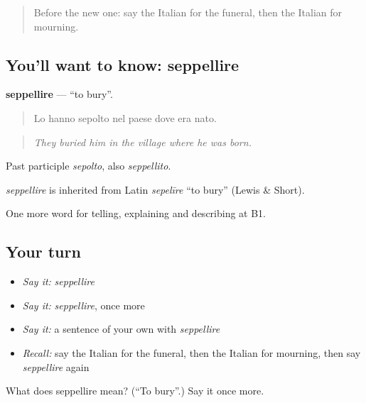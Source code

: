 \label{lesson:IT-C313-seppellire}



\begin{quote}
Before the new one: say the Italian for the funeral, then the Italian for mourning.
\end{quote}

\subsection*{You'll want to know: seppellire}
\textbf{seppellire} — \textquotedblleft{}to bury\textquotedblright{}.

\begin{quote}
Lo hanno sepolto nel paese dove era nato.
\end{quote}

\begin{quote}
\emph{They buried him in the village where he was born.}
\end{quote}

Past participle \emph{sepolto}, also \emph{seppellito}.

\begin{cousinweb}
\emph{seppellire} is inherited from Latin \emph{sepelīre} \textquotedblleft{}to bury\textquotedblright{} (Lewis \& Short).
\end{cousinweb}

\begin{grammarlens}[title={What you've built}]
One more word for telling, explaining and describing at B1.
\end{grammarlens}

\subsection*{Your turn}
\begin{itemize}
\raggedright
  \item \emph{Say it:} \emph{seppellire}
  \item \emph{Say it:} \emph{seppellire}, once more
  \item \emph{Say it:} a sentence of your own with \emph{seppellire}
  \item \emph{Recall:} say the Italian for the funeral, then the Italian for mourning, then say \emph{seppellire} again
\end{itemize}

\begin{tcolorbox}[breakable,colback=teal!4,colframe=teal!35!black,title={Before you move on}]
What does seppellire mean? (\textquotedblleft{}To bury\textquotedblright{}.) Say it once more.
\end{tcolorbox}
